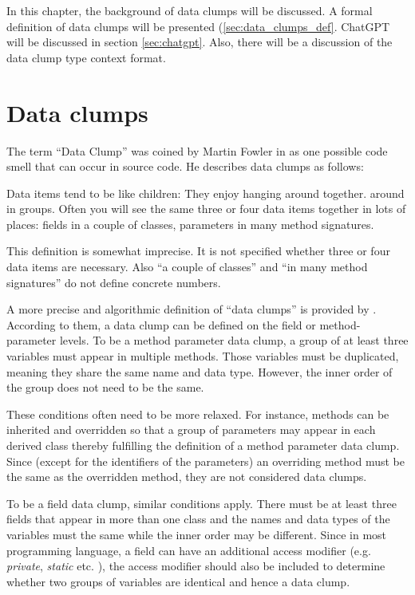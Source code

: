 In this chapter, the background of data clumps will be discussed. A formal definition of data clumps will be presented (\ref{sec:data_clumps_def}. ChatGPT will be discussed in section \ref{sec:chatgpt}. Also, there will be a discussion of the data clump type context format. 

\section{Data clumps}\label{sec:sec:data_clump_def}
The term \enquote{Data Clump} was coined by Martin Fowler in as one possible code smell that can occur in source code. He describes data clumps as follows:

\begin{displayquote}
Data items tend to be like children: They enjoy hanging around together.  around in groups. Often you will see
the same three or four data items together in lots of
places: fields in a couple of classes, parameters in many
method signatures. \cite{fowler2019refactoring} 
\end{displayquote}

This definition is somewhat imprecise. It is not specified whether three or four data items are necessary. Also \enquote{a couple of classes} and \enquote{in many method signatures} do not define concrete numbers.  

A more precise and algorithmic  definition of \enquote{data clumps} is provided by \cite{zhangImprovingPrecisionFowler2008}. According to them, a data clump  can be defined on the field or method-parameter levels. 
To be a method parameter data clump, a group of at least three variables must appear in multiple methods. Those variables must be duplicated, meaning they share the same name and data type. However, the inner order of the group does not need to be the same. 

These conditions often need to be more relaxed. For instance, methods can be inherited and overridden so that a group of parameters may appear in each derived class thereby fulfilling the definition of a method parameter data clump. Since (except for the identifiers of the parameters) an overriding method must be the same as the overridden method, they are not considered data clumps.

To be a field data clump, similar conditions apply. There must be at least three fields that appear in more than one class and the names and data types of the variables must the same while the inner order may be different. Since in most programming language, a field can have an additional access modifier (e.g. \textit{private}, \textit{static} etc. ), the access modifier should also be included to determine whether two groups of variables are identical and hence a data clump.  

